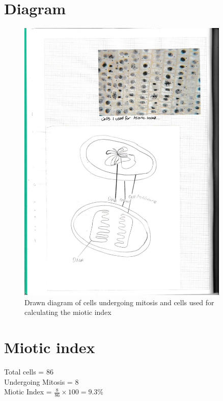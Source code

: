 \documentclass{thomasClass}
\begin{document}
\section{Diagram}
\begin{figure}[H]
    \centering
    \includegraphics[width=0.9\textwidth]{RPA2-IMAGE.pdf}
    \caption{Drawn diagram of cells undergoing mitosis and cells used for calculating the miotic index}
    \label{fig:RPA-2-IMAGE}
\end{figure}

\section{Miotic index}
Total cells = 86\\
Undergoing Mitosis = 8\\
Miotic Index = $\frac{8}{86}\times 100 = 9.3\%$
\end{document}
